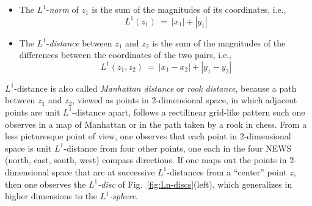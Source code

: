  
\begin{itemize}
\item
The $L^1$-{\it norm}  of $z_1$ is the sum of
the magnitudes of its coordinates, i.e.,
\[ L^1(z_1) \ = \ |x_1| + |y_1|  \]  

\item
The $L^1$-{\it distance}  between $z_1$
and $z_2$ is the sum of the magnitudes of the differences between the
coordinates of the two pairs, i.e.,
\[ L^1(z_1, z_2) \ = \ |x_1 - x_2| + |y_1 - y_2| \]
\end{itemize}
$L^1$-distance is also called {\it Manhattan distance}
 or {\it rook distance},
 because a path between $z_1$ and $z_2$, viewed
as points in $2$-dimensional space, in which adjacent points are unit
$L^1$-distance apart, follows a rectilinear grid-like pattern such one
observes in a map of Manhattan or in the path taken by a rook in
chess.  From a less picturesque point of view, one observes that each
point in $2$-dimensional space is unit $L^1$-distance from four other
points, one each in the four NEWS (north, east, south, west) compass
directions.  If one maps out the points in $2$-dimensional space that
are at successive $L^1$-distances from a ``center'' point $z$, then
one observes the {\it $L^1$-disc}  of
Fig.~\ref{fig:Ln-discs}(left), which generalizes in higher dimensions
to the {\it $L^1$-sphere}. 
